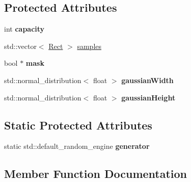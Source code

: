\subsection*{Protected Attributes}
\begin{DoxyCompactItemize}
\item 
\hypertarget{classMultiSampler_a15d6a18e01886258b9fbbda0e5d9b3ce}{}int {\bfseries capacity}\label{classMultiSampler_a15d6a18e01886258b9fbbda0e5d9b3ce}

\item 
std\+::vector$<$ \hyperlink{classRect}{Rect} $>$ \hyperlink{classMultiSampler_a2d082269a868defb6316e4ce4377438e}{samples}
\item 
\hypertarget{classMultiSampler_a6bceab84bd3c04adb118b4b752b10ca7}{}bool $\ast$ {\bfseries mask}\label{classMultiSampler_a6bceab84bd3c04adb118b4b752b10ca7}

\item 
\hypertarget{classMultiSampler_a52bd76ecf27c52ceac4ae57859f4d2a5}{}std\+::normal\+\_\+distribution$<$ float $>$ {\bfseries gaussian\+Width}\label{classMultiSampler_a52bd76ecf27c52ceac4ae57859f4d2a5}

\item 
\hypertarget{classMultiSampler_a6fd61aaca77e32bdbbb6f96cfc2f1e47}{}std\+::normal\+\_\+distribution$<$ float $>$ {\bfseries gaussian\+Height}\label{classMultiSampler_a6fd61aaca77e32bdbbb6f96cfc2f1e47}

\end{DoxyCompactItemize}
\subsection*{Static Protected Attributes}
\begin{DoxyCompactItemize}
\item 
\hypertarget{classMultiSampler_aac018e24b7d3e07ea2058eac5d3f9731}{}static std\+::default\+\_\+random\+\_\+engine {\bfseries generator}\label{classMultiSampler_aac018e24b7d3e07ea2058eac5d3f9731}

\end{DoxyCompactItemize}


\subsection{Member Function Documentation}
\hypertarget{classMultiSampler_af1ef1ab752aff145c7205c137f157691}{}
